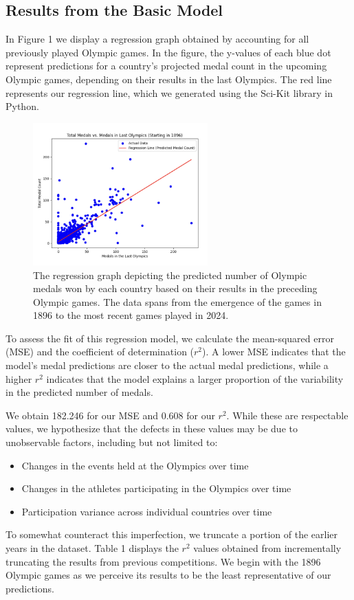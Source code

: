 \documentclass{mcmthesis}
\begin{document}
\subsection{Results from the Basic Model}
In Figure 1 we display a regression graph obtained by accounting for all previously played Olympic games. In the figure, the y-values of each blue dot represent predictions for a country's projected medal count in the upcoming Olympic games, depending on their results in the last Olympics. The red line represents our regression line, which we generated using the Sci-Kit library in Python. \par
\begin{figure}[h] %
    \centering
    \includegraphics[width=0.6\textwidth]{figures/Regression_Grpah_Two.png}
    \caption{The regression graph depicting the predicted number of Olympic medals won by each country based on their results in the preceding Olympic games. The data spans from the emergence of the games in 1896 to the most recent games played in 2024.}
    \label{fig:image2}
\end{figure}
To assess the fit of this regression model, we calculate the mean-squared error (MSE) and the coefficient of determination ($r^2$). A lower MSE indicates that the model's medal predictions are closer to the actual medal predictions, while a higher $r^2$ indicates that the model explains a larger proportion of the variability in the predicted number of medals. \par
We obtain 182.246 for our MSE and 0.608 for our $r^2$. While these are respectable values, we hypothesize that the defects in these values may be due to unobservable factors, including but not limited to:
\begin{itemize}
    \item Changes in the events held at the Olympics over time
    \item Changes in the athletes participating in the Olympics over time
    \item Participation variance across individual countries over time
\end{itemize} \par
To somewhat counteract this imperfection, we truncate a portion of the earlier years in the dataset. Table 1 displays the $r^2$ values obtained from incrementally truncating the results from previous competitions. We begin with the 1896 Olympic games as we perceive its results to be the least representative of our predictions. \par
\end{document}
